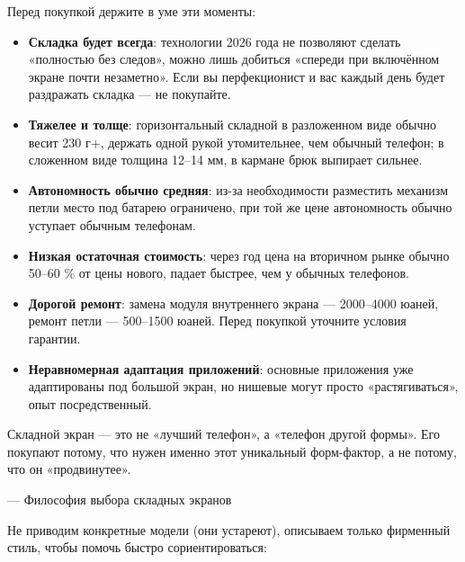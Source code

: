
Перед покупкой держите в уме эти моменты:

\begin{itemize}
  \item \textbf{Складка будет всегда}: технологии 2026 года не позволяют сделать «полностью без следов», можно лишь добиться «спереди при включённом экране почти незаметно». Если вы перфекционист и вас каждый день будет раздражать складка — не покупайте.
  \item \textbf{Тяжелее и толще}: горизонтальный складной в разложенном виде обычно весит 230 г+, держать одной рукой утомительнее, чем обычный телефон; в сложенном виде толщина 12–14 мм, в кармане брюк выпирает сильнее.
  \item \textbf{Автономность обычно средняя}: из-за необходимости разместить механизм петли место под батарею ограничено, при той же цене автономность обычно уступает обычным телефонам.
  \item \textbf{Низкая остаточная стоимость}: через год цена на вторичном рынке обычно 50–60 \% от цены нового, падает быстрее, чем у обычных телефонов.
  \item \textbf{Дорогой ремонт}: замена модуля внутреннего экрана — 2000–4000 юаней, ремонт петли — 500–1500 юаней. Перед покупкой уточните условия гарантии.
  \item \textbf{Неравномерная адаптация приложений}: основные приложения уже адаптированы под большой экран, но нишевые могут просто «растягиваться», опыт посредственный.
\end{itemize}

Складной экран — это не «лучший телефон», а «телефон другой формы». Его покупают потому, что нужен именно этот уникальный форм-фактор, а не потому, что он «продвинутее».

— Философия выбора складных экранов


Не приводим конкретные модели (они устареют), описываем только фирменный стиль, чтобы помочь быстро сориентироваться:

